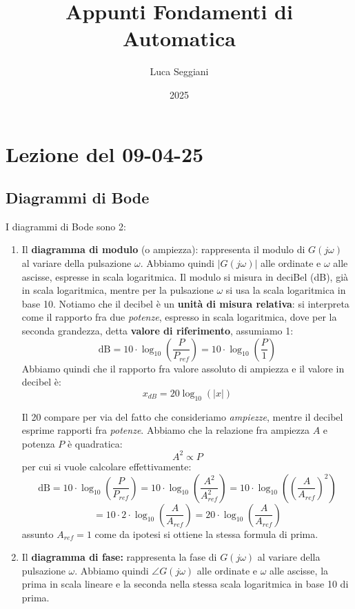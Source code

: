 \documentclass[a4paper,11pt]{article}
\title{Appunti Fondamenti di Automatica}
\author{Luca Seggiani}
\date{2025}
\begin{document}
\section{Lezione del 09-04-25}

\thispagestyle{empty}
\pagestyle{fancy}

\subsection{Diagrammi di Bode}
I diagrammi di Bode sono 2:
\begin{enumerate}
	\item Il \textbf{diagramma di modulo} (o ampiezza): rappresenta il modulo di $G(j\omega)$ al variare della pulsazione $\omega$.
		Abbiamo quindi $|G(j \omega)|$ alle ordinate e $\omega$ alle ascisse, espresse in scala logaritmica.
		Il modulo si misura in deciBel (dB), già in scala logaritmica, mentre per la pulsazione $\omega$ si usa la scala logaritmica in base 10.
		Notiamo che il decibel è un \textbf{unità di misura relativa}: si interpreta come il rapporto fra due \textit{potenze}, espresso in scala logaritmica, dove per la seconda grandezza, detta \textbf{valore di riferimento}, assumiamo 1:
		$$
		\mathrm{dB} = 10 \cdot \log_{10} \left( \frac{P}{P_{ref}} \right) =  10 \cdot \log_{10} \left( \frac{P}{1} \right)
		$$
		Abbiamo quindi che il rapporto fra valore assoluto di ampiezza e il valore in decibel è:
		$$
		x_{dB} = 20 \log_{10}(|x|)
		$$

		Il 20 compare per via del fatto che consideriamo \textit{ampiezze}, mentre il decibel esprime rapporti fra \textit{potenze}.
	Abbiamo che la relazione fra ampiezza $A$ e potenza $P$ è quadratica:
	$$
	A^2 \propto P
	$$
	per cui si vuole calcolare effettivamente:
	$$
	\mathrm{dB} = 10 \cdot \log_{10} \left( \frac{P}{P_{ref}} \right) = 10 \cdot \log_{10} \left( \frac{A^2}{A_{ref}^2} \right) = 10 \cdot \log_{10} \left( \left( \frac{A}{A_{ref}} \right)^2 \right)
	$$
	$$
	= 10 \cdot 2 \cdot \log_{10} \left( \frac{A}{A_{ref}} \right) = 20 \cdot \log_{10} \left( \frac{A}{A_{ref}} \right)
	$$
	assunto $A_{ref} = 1$ come da ipotesi si ottiene la stessa formula di prima.

	\item Il \textbf{diagramma di fase:} rappresenta la fase di $G(j\omega)$ al variare della pulsazione $\omega$.
		Abbiamo quindi $\angle G(j \omega)$ alle ordinate e $\omega$ alle ascisse, la prima in scala lineare e la seconda nella stessa scala logaritmica in base 10 di prima.
\end{enumerate}
\end{document}
